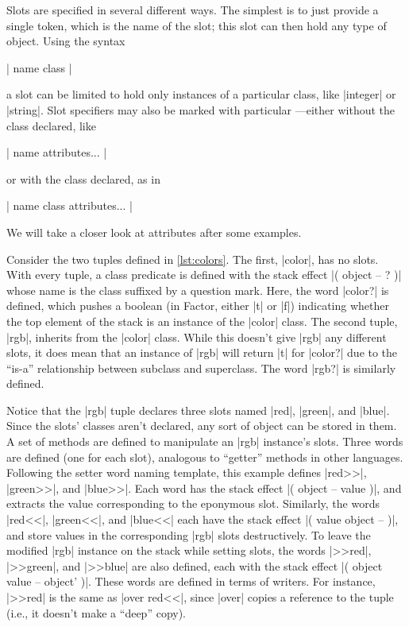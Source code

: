 Slots are specified in several different ways.  The simplest is to just provide
a single token, which is the name of the slot; this slot can then hold any type
of object.  Using the syntax
%
\begin{center} \factor|{ name class }| \end{center}
%
\noindent a slot can be limited to hold only instances of a particular class,
like \factor|integer| or \factor|string|.  Slot specifiers may also be marked
with particular ---either without the class declared, like
%
\begin{center} \factor|{ name attributes... }| \end{center}
%
\noindent or with the class declared, as in
%
\begin{center} \factor|{ name class attributes... }| \end{center}
%
\noindent We will take a closer look at attributes after some examples.


Consider the two tuples defined in \vref{lst:colors}.  The first,
\factor|color|, has no slots.  With every tuple, a class predicate is defined
with the stack effect
%
\factor|( object -- ? )|
%
whose name is the class suffixed by a question mark.  Here, the word
\factor|color?| is defined, which pushes a boolean (in Factor, either
\factor|t| or \factor|f|) indicating whether the top element of the stack is an
instance of the \factor|color| class.  The second tuple, \factor|rgb|, inherits
from the \factor|color| class.  While this doesn't give \factor|rgb| any
different slots, it does mean that an instance of \factor|rgb| will return
\factor|t| for \factor|color?| due to the ``is-a'' relationship between
subclass and superclass.  The word \factor|rgb?| is similarly defined.

Notice that the \factor|rgb| tuple declares three slots named \factor|red|,
\factor|green|, and \factor|blue|.  Since the slots' classes aren't declared,
any sort of object can be stored in them.  A set of methods are defined to
manipulate an \factor|rgb| instance's slots.  Three  words are
defined (one for each slot), analogous to ``getter'' methods in other
languages.  Following the setter word naming template, this example defines
\factor|red>>|, \factor|green>>|, and \factor|blue>>|.  Each word has the stack
effect
%
\factor|( object -- value )|,
%
and extracts the value corresponding to the eponymous slot.  Similarly, the
 words \factor|red<<|, \factor|green<<|, and \factor|blue<<| each
have the stack effect
%
\factor|( value object -- )|,
%
and store values in the corresponding \factor|rgb| slots destructively.  To
leave the modified \factor|rgb| instance on the stack while setting slots, the
 words \factor|>>red|, \factor|>>green|, and \factor|>>blue| are
also defined, each with the stack effect
%
\factor|( object value -- object' )|.
%
These words are defined in terms of writers.  For instance, \factor|>>red| is
the same as \factor|over red<<|, since \factor|over| copies a reference to the
tuple (i.e., it doesn't make a ``deep'' copy).

